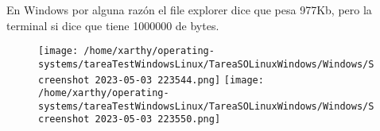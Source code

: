 \documentclass[10pt, article, natbib]{IEEEtran}
\begin{document}
En Windows por alguna razón el file explorer dice que pesa 977Kb, pero la terminal si dice que tiene 1000000 de bytes.

\begin{figure} [h]
\texttt{[image: /home/xarthy/operating-systems/tareaTestWindowsLinux/TareaSOLinuxWindows/Windows/Screenshot 2023-05-03 223544.png]}
\texttt{[image: /home/xarthy/operating-systems/tareaTestWindowsLinux/TareaSOLinuxWindows/Windows/Screenshot 2023-05-03 223550.png]}
\end{figure}
\end{document}
